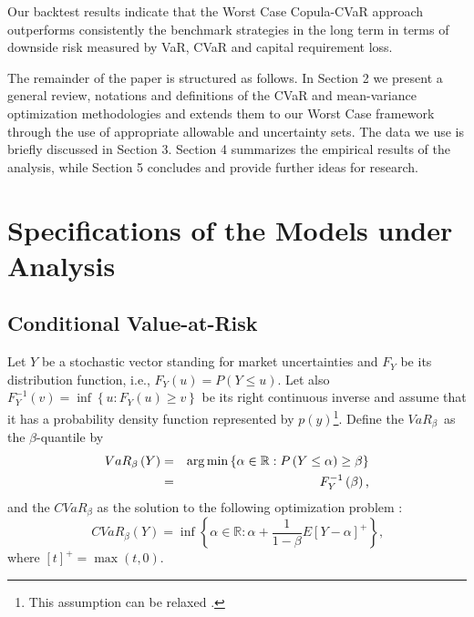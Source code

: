 \documentclass[a4paper,12pt]{report}
\begin{document}
\begin{refsection}
Our backtest results indicate
that the Worst Case Copula-CVaR approach outperforms consistently the
benchmark strategies in the long term in terms of downside risk measured by VaR, CVaR and capital requirement loss. 

The remainder of the paper is structured as follows. In Section 2 we present
a general review, notations and definitions of the CVaR and mean-variance
optimization methodologies and extends them to our Worst Case framework
through the use of appropriate allowable and uncertainty sets. The data we
use is briefly discussed in Section 3. Section 4 summarizes the empirical
results of the analysis, while Section 5 concludes and provide further ideas
for research.

\vspace{0.6cm}

\section{Specifications of the Models under Analysis}

\label{section2}

\subsection{Conditional Value-at-Risk}

Let $Y$ be a stochastic vector standing for market uncertainties and $F_{Y}$
be its distribution function, i.e., $F_{Y}\left( u\right) =P\left( Y\leq
u\right) $. Let also $F_{Y}^{-1}\left( v\right) =\inf \left\{ u:F_{Y}\left(
u\right) \geq v\right\} $ be its right continuous inverse and assume that it
has a probability density function represented by $p(y)$\footnote{%
	This assumption can be relaxed \citep{uryasev2013}.}. Define the $VaR_{\beta
}$\thinspace\ as the $\beta $-quantile by
\begin{eqnarray}
VaR_{\beta }\left( Y\right) &=& \arg \min \left\{ \alpha \in
\mathbb{R}
:P\left( Y\leq \alpha \right) \geq \beta \right\}  \label{one} \\
&=&F_{Y}^{-1}\left( \beta \right) \text{,}  \notag
\end{eqnarray}%
and the $CVaR_{\beta }$ as the solution to the following optimization
problem \citep{pflug2000}:
\begin{equation}
CVaR_{\beta }\left( Y\right) =\inf \left\{ \alpha \in
\mathbb{R}
:\alpha +\frac{1}{1-\beta }E\left[ Y-\alpha \right] ^{+}\right\} \text{,}
\label{two}
\end{equation}%
where $\left[ t\right] ^{+}=\max \left( t,0\right) $.


\end{refsection}
\end{document}
